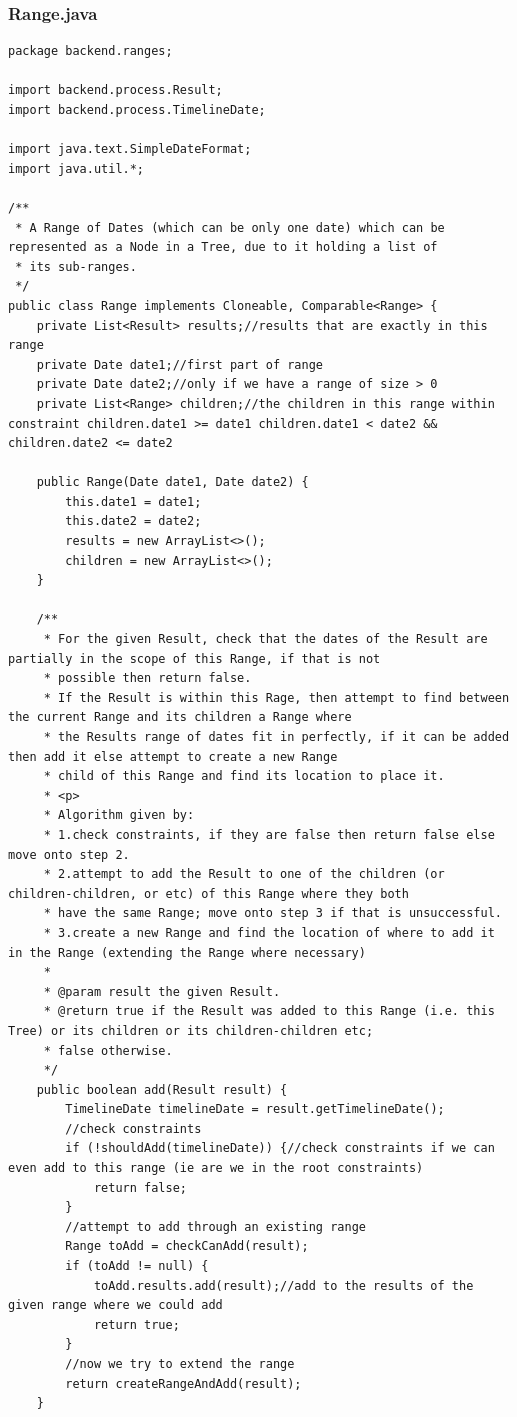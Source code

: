 \subsubsection{Range.java}
\begin{lstlisting}
package backend.ranges;

import backend.process.Result;
import backend.process.TimelineDate;

import java.text.SimpleDateFormat;
import java.util.*;

/**
 * A Range of Dates (which can be only one date) which can be represented as a Node in a Tree, due to it holding a list of
 * its sub-ranges.
 */
public class Range implements Cloneable, Comparable<Range> {
    private List<Result> results;//results that are exactly in this range
    private Date date1;//first part of range
    private Date date2;//only if we have a range of size > 0
    private List<Range> children;//the children in this range within constraint children.date1 >= date1 children.date1 < date2 && children.date2 <= date2

    public Range(Date date1, Date date2) {
        this.date1 = date1;
        this.date2 = date2;
        results = new ArrayList<>();
        children = new ArrayList<>();
    }

    /**
     * For the given Result, check that the dates of the Result are partially in the scope of this Range, if that is not
     * possible then return false.
     * If the Result is within this Rage, then attempt to find between the current Range and its children a Range where
     * the Results range of dates fit in perfectly, if it can be added then add it else attempt to create a new Range
     * child of this Range and find its location to place it.
     * <p>
     * Algorithm given by:
     * 1.check constraints, if they are false then return false else move onto step 2.
     * 2.attempt to add the Result to one of the children (or children-children, or etc) of this Range where they both
     * have the same Range; move onto step 3 if that is unsuccessful.
     * 3.create a new Range and find the location of where to add it in the Range (extending the Range where necessary)
     *
     * @param result the given Result.
     * @return true if the Result was added to this Range (i.e. this Tree) or its children or its children-children etc;
     * false otherwise.
     */
    public boolean add(Result result) {
        TimelineDate timelineDate = result.getTimelineDate();
        //check constraints
        if (!shouldAdd(timelineDate)) {//check constraints if we can even add to this range (ie are we in the root constraints)
            return false;
        }
        //attempt to add through an existing range
        Range toAdd = checkCanAdd(result);
        if (toAdd != null) {
            toAdd.results.add(result);//add to the results of the given range where we could add
            return true;
        }
        //now we try to extend the range
        return createRangeAndAdd(result);
    }


\end{lstlisting}
